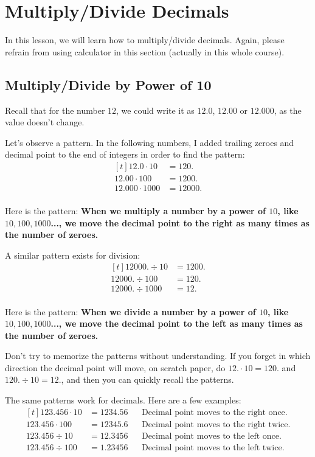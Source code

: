 
\section{Multiply/Divide Decimals}

In this lesson, we will learn how to multiply/divide decimals. Again, please refrain from using calculator in this section (actually in this whole course).

\subsection{Multiply/Divide by Power of 10}
Recall that for the number $12$, we could write it as $12.0$, $12.00$ or $12.000$, as the value doesn't change.

Let's observe a pattern. In the following numbers, I added trailing zeroes and decimal point to the end of integers in order to find the pattern:
\[
\begin{aligned}[t]
	12.0\cdot10 &= 120. \\
	12.00\cdot100 &= 1200. \\
	12.000\cdot1000 &= 12000. \\
\end{aligned}
\]

Here is the pattern: \textbf{When we multiply a number by a power of $10$, like $10,100,1000$..., we move the decimal point to the right as many times as the number of zeroes.}

A similar pattern exists for division:
\[
\begin{aligned}[t]
	12000.\div10 &= 1200. \\
	12000.\div100 &= 120. \\
	12000.\div1000 &= 12. \\
\end{aligned}
\]

Here is the pattern: \textbf{When we divide a number by a power of $10$, like $10,100,1000$..., we move the decimal point to the left as many times as the number of zeroes.}

Don't try to memorize the patterns without understanding. If you forget in which direction the decimal point will move, on scratch paper, do $12.\cdot10=120.$ and $120.\div10=12.$, and then you can quickly recall the patterns.

The same patterns work for decimals. Here are a few examples:
\[
\begin{aligned}[t]
	123.456\cdot10 &= 1234.56 &&\text{Decimal point moves to the right once.}\\
	123.456\cdot100 &= 12345.6 &&\text{Decimal point moves to the right twice.}\\
	123.456\div10 &= 12.3456 &&\text{Decimal point moves to the left once.}\\
	123.456\div100 &= 1.23456 &&\text{Decimal point moves to the left twice.}
\end{aligned}
\]

